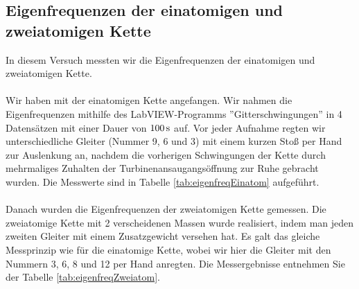 \documentclass[a4paper,titlepage]{scrartcl}
\numberwithin{equation}{section}
\begin{document}
\subsection{Eigenfrequenzen der einatomigen und zweiatomigen Kette}
In diesem Versuch messten wir die Eigenfrequenzen der einatomigen und zweiatomigen Kette.\\ \\
Wir haben mit der einatomigen Kette angefangen. Wir nahmen die Eigenfrequenzen mithilfe des LabVIEW-Programms ''Gitterschwingungen'' in 4 Datensätzen mit einer Dauer von $\unit[100]{s}$ auf. Vor jeder Aufnahme regten wir unterschiedliche Gleiter (Nummer 9, 6 und 3) mit einem kurzen Stoß per Hand zur Auslenkung an, nachdem die vorherigen Schwingungen der Kette durch mehrmaliges Zuhalten der Turbinenansaugangsöffnung zur Ruhe gebracht wurden. Die Messwerte sind in Tabelle \ref{tab:eigenfreqEinatom} aufgeführt.\\ \\
Danach wurden die Eigenfrequenzen der zweiatomigen Kette gemessen. Die zweiatomige Kette mit 2 verscheidenen Massen wurde realisiert, indem man jeden zweiten Gleiter mit einem Zusatzgewicht versehen hat. Es galt das gleiche Messprinzip wie für die einatomige Kette, wobei wir hier die Gleiter mit den Nummern 3, 6, 8 und 12 per Hand anregten. Die Messergebnisse entnehmen Sie der Tabelle \ref{tab:eigenfreqZweiatom}.
\end{document}
